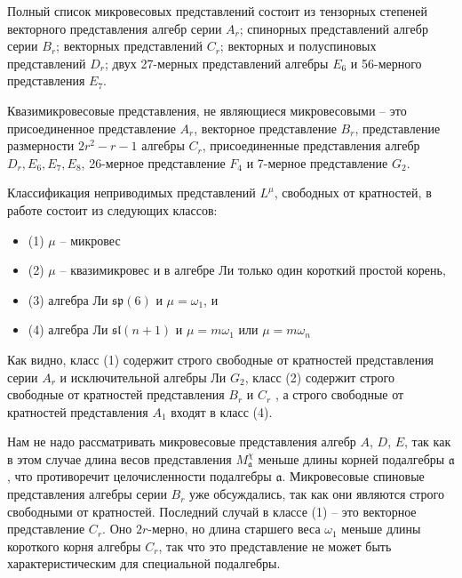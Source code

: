 \documentclass[12pt]{article}
\newcommand{\af}{\mathfrak{a}}
\begin{document}
Полный список микровесовых представлений состоит из тензорных степеней векторного представления
алгебр серии $A_{r}$; спинорных представлений алгебр серии $B_{r}$; векторных представлений $C_{r}$;
векторных и полуспиновых представлений $D_{r}$; двух 
27-мерных представлений алгебры $E_{6}$ и  56-мерного представления $E_{7}$. 

Квазимикровесовые представления, не являющиеся микровесовыми -- это присоединенное представление
$A_{r}$, векторное представление $B_{r}$, представление размерности $2r^{2}-r-1$ алгебры $C_{r}$,
присоединенные представления алгебр $D_{r}, E_{6}, E_{7}, E_{8}$, 26-мерное представление $F_{4}$ и
7-мерное представление $G_{2}$.


Классификация неприводимых представлений  $L^{\mu}$, свободных от кратностей, в работе
\cite{howe1995perspectives,stembridge2003multiplicity} состоит из следующих классов:
\begin{itemize}
\item (1) $\mu$ -- микровес
\item (2) $\mu$ -- квазимикровес и в алгебре Ли только один короткий простой корень,
\item (3) алгебра Ли $\mathfrak{sp}(6)$ и $\mu=\omega_{1}$, и
\item (4) алгебра Ли $\mathfrak{sl}(n + 1)$ и  $\mu= m\omega_{1}$ или $\mu  = m\omega_{n}$ 
\end{itemize}

Как видно, класс (1) содержит строго свободные от кратностей представления серии  $A_{r}$ и
исключительной алгебры Ли $G_{2}$, класс  (2) содержит строго свободные от кратностей представления
$ B_{r}$ и $C_{r}$ , а строго свободные от кратностей представления $A_{1}$ входят в класс (4).

Нам не надо рассматривать микровесовые представления алгебр $A$, $D$, $E$, так как в этом случае
длина весов представления  $M^{\chi}_{\af}$ меньше длины корней подалгебры  $\af$, что противоречит
целочисленности подалгебры  $\af$. Микровесовые спиновые представления алгебры серии $B_{r}$ уже
обсуждались, так как они являются строго свободными от кратностей. Последний случай в классе (1) --
это векторное представление  $C_{r}$. Оно  $2r$-мерно, но длина старшего веса $\omega_{1}$ меньше
длины короткого корня алгебры $C_{r}$, так что это представление не может быть характеристическим
для специальной подалгебры. 
\end{document}

